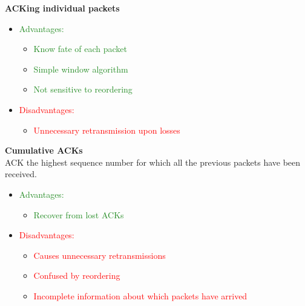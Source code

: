 \documentclass[a4paper, fontsize=8pt, landscape, DIV=1]{scrartcl}
\begin{document}
\begin{multicols*}{4}
    		\textbf{ACKing individual packets}
    		\vspace{-0.2cm}
    		\begin{itemize}[noitemsep]
    			\item \textcolor{ForestGreen}{Advantages:}
    			\begin{itemize}
    				\item \textcolor{ForestGreen}{Know fate of each packet} 
    				\item \textcolor{ForestGreen}{Simple window algorithm}
    				\item \textcolor{ForestGreen}{Not sensitive to reordering}
    			\end{itemize}
    			\item \textcolor{red}{Disadvantages:}
    			\begin{itemize}
    				\item \textcolor{red}{Unnecessary retransmission upon losses}
    			\end{itemize} 
			\end{itemize}
		
    		\textbf{Cumulative ACKs}\\
   			ACK the highest sequence number for which all the previous packets have been received.
   			\vspace{-0.2cm}
   			\begin{itemize}[noitemsep]
   				\item \textcolor{ForestGreen}{Advantages:}
   				\begin{itemize}
   					\item \textcolor{ForestGreen}{Recover from lost ACKs}
   				\end{itemize}
   				\item \textcolor{red}{Disadvantages:}
   				\begin{itemize}
   					\item \textcolor{red}{Causes unnecessary retransmissions}
   					\item \textcolor{red}{Confused by reordering}
   					\item \textcolor{red}{Incomplete information about which packets have arrived}
   				\end{itemize} 
   			\end{itemize}
   		

\end{multicols*}
\end{document}
